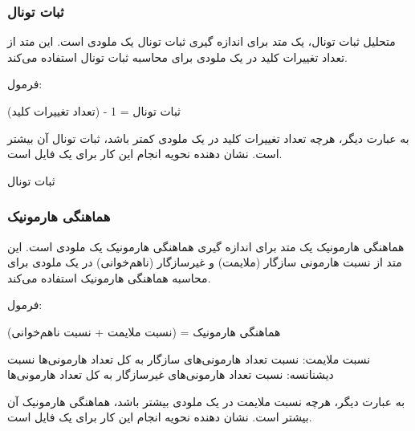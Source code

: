 \subsubsection{ ثبات تونال }

متحلیل ثبات تونال، یک متد برای اندازه گیری ثبات تونال یک ملودی است. این متد از تعداد تغییرات کلید در یک ملودی برای محاسبه ثبات تونال استفاده می‌کند.

فرمول:

ثبات تونال = 1 - (تعداد تغییرات کلید)

به عبارت دیگر، هرچه تعداد تغییرات کلید در یک ملودی کمتر باشد، ثبات تونال آن بیشتر است.
 نشان دهنده نحویه انجام این کار برای یک فایل  است.


\begin{LTR}
      \begin{algorithm}
            \caption{ثبات تونال }
            \setmainfont{Times New Roman}
            \label{alg:analyze_tonal_stability}
            \begin{algorithmic}
            \end{algorithmic}
      \end{algorithm}
\end{LTR}

\subsubsection{ هماهنگی هارمونیک  }

هماهنگی هارمونیک یک متد برای اندازه گیری هماهنگی هارمونیک یک ملودی است. این متد از نسبت هارمونی سازگار (ملایمت) و غیرسازگار (نا‌هم‌خوانی) در یک ملودی برای محاسبه هماهنگی هارمونیک استفاده می‌کند.

فرمول:

هماهنگی هارمونیک = (نسبت ملایمت + نسبت نا‌هم‌خوانی)

نسبت ملایمت: نسبت تعداد هارمونی‌های سازگار به کل تعداد هارمونی‌ها
نسبت دیشنانسه: نسبت تعداد هارمونی‌های غیرسازگار به کل تعداد هارمونی‌ها

به عبارت دیگر، هرچه نسبت ملایمت در یک ملودی بیشتر باشد، هماهنگی هارمونیک آن بیشتر است.
 نشان دهنده نحویه انجام این کار برای یک فایل  است.


